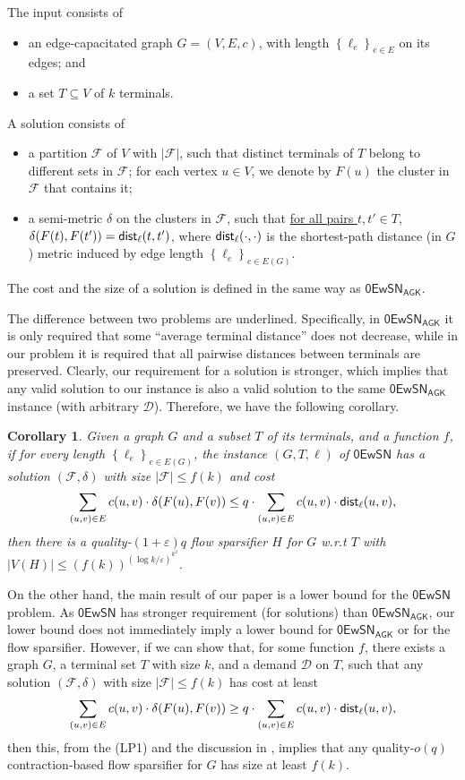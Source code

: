 \documentclass[11pt]{article}
\newtheorem{corollary}[theorem]{Corollary}
\theoremstyle{definition}
\newcommand{\set}[1]{\left\{ #1 \right\}}
\newcommand{\dset}{{\mathcal{D}}}
\newcommand{\fset}{{\mathcal{F}}}
\newcommand{\eps}{{\varepsilon}}
\newcommand{\dist}{\textnormal{\textsf{dist}}}
\newcounter{note}
\newcommand{\zesn}{\mathsf{0EwSN}}
\begin{document}
The input consists of
\begin{itemize}
	\item an edge-capacitated graph $G=(V,E,c)$, with length $\set{\ell_e}_{e\in E}$ on its edges; and
	\item a set $T\subseteq V$ of $k$ terminals.
\end{itemize}
A solution consists of
\begin{itemize}
	\item a partition $\fset$ of $V$ with $|\fset|$, such that distinct terminals of $T$ belong to different sets in $\fset$; for each vertex $u\in V$, we denote by $F(u)$ the cluster in $\fset$ that contains it;
	\item a semi-metric $\delta$ on the clusters in $\fset$, such that \underline{for all pairs $t,t'\in T$, $\delta(F(t),F(t'))= \dist_{\ell}(t,t')$}, where $\dist_{\ell}(\cdot,\cdot)$ is the shortest-path distance (in $G$) metric induced by edge length $\set{\ell_e}_{e\in E(G)}$.
\end{itemize}
The cost and the size of a solution is defined in the same way as $\zesn_{\textsf{AGK}}$.


The difference between two problems are underlined. Specifically, in $\zesn_{\textsf{AGK}}$ it is only required that some ``average terminal distance'' does not decrease, while in our problem it is  required that all pairwise distances between terminals are preserved.
Clearly, our requirement for a solution is stronger, which implies that any valid solution to our instance is also a valid solution to the same $\zesn_{\textsf{AGK}}$ instance (with arbitrary $\dset$). Therefore, we have the following corollary.

\begin{corollary}
Given a graph $G$ and a subset $T$ of its terminals, and a function $f$, if for every length $\set{\ell_e}_{e\in E(G)}$, the instance $(G,T,\ell)$ of $\zesn$ has a solution $(\fset,\delta)$ with size $|\fset|\le f(k)$ and cost 
	\[\sum_{(u,v)\in E}c(u,v)\cdot\delta(F(u),F(v))\le q\cdot \sum_{(u,v)\in E}c(u,v)\cdot\dist_{\ell}(u,v),\] 
	then there is a quality-$(1+\eps) q$ flow sparsifier $H$ for $G$ w.r.t $T$ with $|V(H)|\le (f(k))^{(\log k/\eps)^{k^2}}$.
\end{corollary}

On the other hand, the main result of our paper is a lower bound for the $\zesn$ problem. As $\zesn$ has stronger requirement (for solutions) than $\zesn_{\textsf{AGK}}$, our lower bound does not immediately imply a lower bound for $\zesn_{\textsf{AGK}}$ or for the flow sparsifier. However, if we can show that, for some function $f$, there exists a graph $G$, a terminal set $T$ with size $k$, and a demand $\dset$ on $T$, such that any solution $(\fset,\delta)$ with size $|\fset|\le f(k)$ has cost at least
\[\sum_{(u,v)\in E}c(u,v)\cdot\delta(F(u),F(v))\ge q\cdot \sum_{(u,v)\in E}c(u,v)\cdot\dist_{\ell}(u,v),\] 
then this, from the (LP1) and the discussion in \cite{andoni2014towards}, implies that any quality-$o(q)$ contraction-based flow sparsifier for $G$ has size at least $f(k)$.
\end{document}

